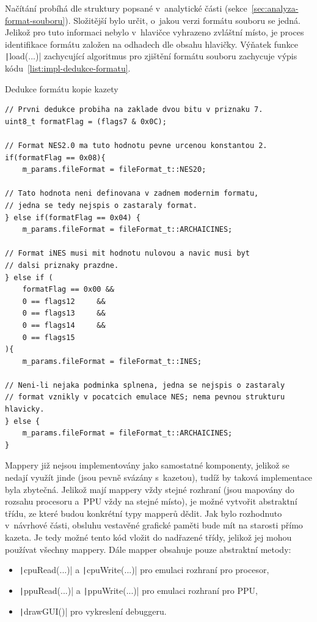 Načítání probíhá dle struktury popsané v~analytické části (sekce~\ref{sec:analyza-format-souboru}). Složitější bylo určit, o~jakou verzi formátu souboru se jedná. Jelikož pro tuto informaci nebylo v~hlavičce vyhrazeno zvláštní místo, je proces identifikace formátu založen na odhadech dle obsahu hlavičky. Výňatek funkce \texttt|load(...)| zachycující algoritmus pro zjištění formátu souboru zachycuje výpis kódu~\ref{list:impl-dedukce-formatu}.

\begin{listing}
	\caption{Dedukce formátu kopie kazety}
	\label{list:impl-dedukce-formatu}
	\begin{verbatim}
// Prvni dedukce probiha na zaklade dvou bitu v priznaku 7.
uint8_t formatFlag = (flags7 & 0x0C);

// Format NES2.0 ma tuto hodnotu pevne urcenou konstantou 2.
if(formatFlag == 0x08){
	m_params.fileFormat = fileFormat_t::NES20;
	
// Tato hodnota neni definovana v zadnem modernim formatu,
// jedna se tedy nejspis o zastaraly format.
} else if(formatFlag == 0x04) {
	m_params.fileFormat = fileFormat_t::ARCHAICINES;
	
// Format iNES musi mit hodnotu nulovou a navic musi byt
// dalsi priznaky prazdne.
} else if (
	formatFlag == 0x00 &&
	0 == flags12     &&
	0 == flags13     &&
	0 == flags14     &&
	0 == flags15
){
	m_params.fileFormat = fileFormat_t::INES;
	
// Neni-li nejaka podminka splnena, jedna se nejspis o zastaraly
// format vznikly v pocatcich emulace NES; nema pevnou strukturu hlavicky.
} else {
	m_params.fileFormat = fileFormat_t::ARCHAICINES;
}	
	\end{verbatim}
\end{listing}

Mappery již nejsou implementovány jako samostatné komponenty, jelikož se nedají využít jinde (jsou pevně svázány s~kazetou), tudíž by taková implementace byla zbytečná. Jelikož mají mappery vždy stejné rozhraní (jsou mapovány do rozsahu procesoru a~PPU vždy na stejné místo), je možné vytvořit abstraktní třídu, ze které budou konkrétní typy mapperů dědit. Jak bylo rozhodnuto v~návrhové části, obsluhu vestavěné grafické paměti bude mít na starosti přímo kazeta. Je tedy možné tento kód vložit do nadřazené třídy, jelikož jej mohou používat všechny mappery. Dále mapper obsahuje pouze abstraktní metody:
\begin{itemize}
	\item \texttt|cpuRead(...)| a \texttt|cpuWrite(...)| pro emulaci rozhraní pro procesor,
	\item \texttt|ppuRead(...)| a \texttt|ppuWrite(...)| pro emulaci rozhraní pro PPU,
	\item \texttt|drawGUI()| pro vykreslení debuggeru.
\end{itemize}

